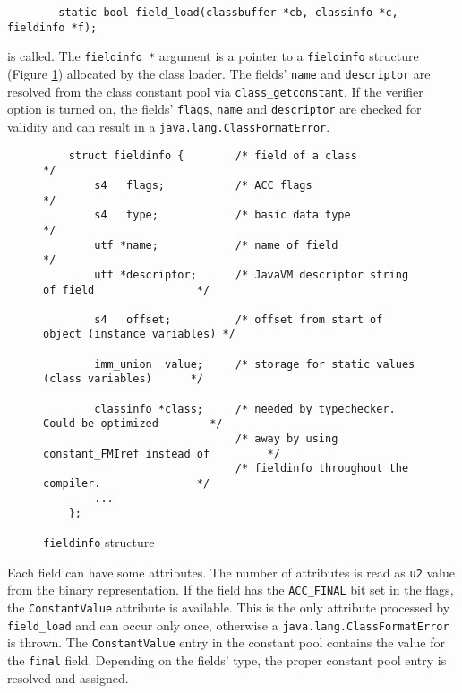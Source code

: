 \begin{verbatim}
        static bool field_load(classbuffer *cb, classinfo *c, fieldinfo *f);
\end{verbatim}

is called. The \texttt{fieldinfo *} argument is a pointer to a
\texttt{fieldinfo} structure (Figure \ref{fieldinfostructure})
allocated by the class loader. The fields' \texttt{name} and
\texttt{descriptor} are resolved from the class constant pool via
\texttt{class\_getconstant}. If the verifier option is turned on, the
fields' \texttt{flags}, \texttt{name} and \texttt{descriptor} are
checked for validity and can result in a
\texttt{java.lang.ClassFormatError}.

\begin{figure}[h]
\begin{verbatim}
    struct fieldinfo {        /* field of a class                                 */
        s4   flags;           /* ACC flags                                        */
        s4   type;            /* basic data type                                  */
        utf *name;            /* name of field                                    */
        utf *descriptor;      /* JavaVM descriptor string of field                */
	
        s4   offset;          /* offset from start of object (instance variables) */

        imm_union  value;     /* storage for static values (class variables)      */

        classinfo *class;     /* needed by typechecker. Could be optimized        */
                              /* away by using constant_FMIref instead of         */
                              /* fieldinfo throughout the compiler.               */
        ...
    };
\end{verbatim}
\caption{\texttt{fieldinfo} structure}
\label{fieldinfostructure}
\end{figure}

Each field can have some attributes. The number of attributes is read
as \texttt{u2} value from the binary representation. If the field has
the \texttt{ACC\_FINAL} bit set in the flags, the
\texttt{ConstantValue} attribute is available. This is the only
attribute processed by \texttt{field\_load} and can occur only once,
otherwise a \texttt{java.lang.ClassFormatError} is thrown. The
\texttt{ConstantValue} entry in the constant pool contains the value
for the \texttt{final} field. Depending on the fields' type, the
proper constant pool entry is resolved and assigned.


